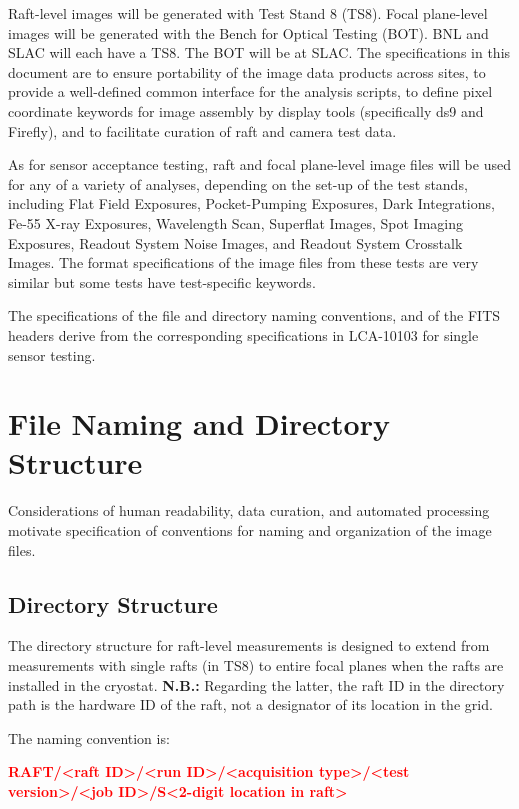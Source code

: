 \documentclass{article}[12pt]
\newcommand{\red}{\textcolor{red}}
\begin{document}
Raft-level images will be generated with Test Stand 8 (TS8).  Focal plane-level images will be generated with the Bench for Optical Testing (BOT).  BNL and SLAC will each have a TS8.  The BOT will be at SLAC.  The specifications in this document are to ensure portability of the image data products across sites, to provide a well-defined common interface for the analysis scripts, to define pixel coordinate keywords for image assembly by display tools (specifically ds9 and Firefly), and to facilitate curation of raft and camera test data.

As for sensor acceptance testing, raft and focal plane-level image files will be used for any of a variety of analyses, depending on the set-up of the test stands, including Flat Field Exposures, Pocket-Pumping Exposures, Dark Integrations, Fe-55 X-ray Exposures, Wavelength Scan, Superflat Images, Spot Imaging Exposures, Readout System Noise Images, and Readout System Crosstalk Images.
The format specifications of the image files from these tests are very similar but some tests have test-specific keywords.  

The specifications of the file and directory naming conventions, and of the FITS headers derive from the corresponding specifications in LCA-10103 for single sensor testing.

\section{File Naming and Directory Structure}
Considerations of human readability, data curation, and automated processing motivate specification of conventions for naming and organization of the image files.

\subsection{Directory Structure}

The directory structure for raft-level measurements is designed to extend from measurements with single rafts (in TS8) to entire focal planes when the rafts are installed in the cryostat.  {\bf N.B.:} Regarding the latter, the raft ID in the directory path is the hardware ID of the raft, not a designator of its location in the grid. 

The naming convention is:


\red{{\bf RAFT/<raft ID>/<run ID>/<acquisition type>/<test version>/<job ID>/S<2-digit location in raft>}}
\end{document}

